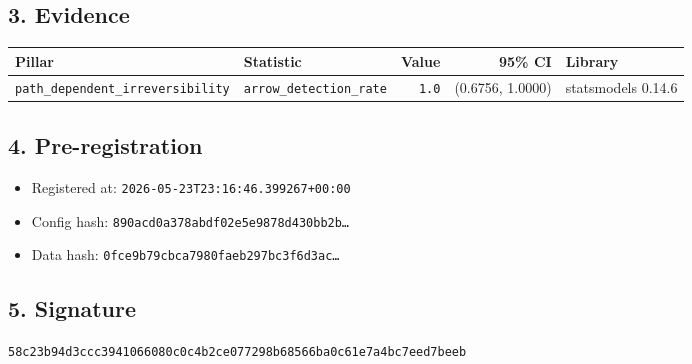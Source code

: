 \documentclass{article}
\begin{document}
\subsection*{3. Evidence}
\begin{tabular}{llrrl}\toprule
\textbf{Pillar} & \textbf{Statistic} & \textbf{Value} & \textbf{95\% CI} & \textbf{Library} \\\midrule
\texttt{path\_dependent\_irreversibility} & \texttt{arrow\_detection\_rate} & \texttt{1.0} & (0.6756, 1.0000) & statsmodels 0.14.6 \\
\bottomrule\end{tabular}
\subsection*{4. Pre-registration}
\begin{itemize}
\item Registered at: \texttt{2026-05-23T23:16:46.399267+00:00}
\item Config hash: \texttt{890acd0a378abdf02e5e9878d430bb2b\dots}
\item Data hash: \texttt{0fce9b79cbca7980faeb297bc3f6d3ac\dots}
\end{itemize}
\subsection*{5. Signature}
\texttt{58c23b94d3ccc3941066080c0c4b2ce077298b68566ba0c61e7a4bc7eed7beeb}\\
\end{document}
